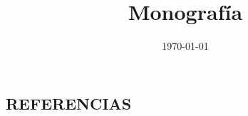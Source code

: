 \documentclass[12pt,a4paper,oneside,english,spanish]{book}
\title{Monografía}
\author{}
\date{\today}
\begin{document}
    \renewcommand{\refname}{}
    \renewcommand{\tablename}{Tabla}


    
        
    \newpage
    \renewcommand{\contentsname}{\centering TABLA DE CONTENIDO}
    \vfill
    \tableofcontents
    \cleardoublepage 

    \renewcommand{\listtablename}{\centering LISTA DE TABLAS}
    \listoftables
    \cleardoublepage 

    \renewcommand{\listfigurename}{\centering LISTA DE FIGURAS}
    \listoffigures
    \cleardoublepage 

    
    \cleardoublepage 
    \printglossary[type=\acronymtype, title=\centering LISTA DE ACRÓNIMOS]


    \newpage

    
    
    
    

    
    \newpage
    \begin{center}
        \section{REFERENCIAS}
    \end{center}
    \printbibliography[title={}] %
    \renewcommand*{\UrlFont}{\rmfamily}
\end{document}
